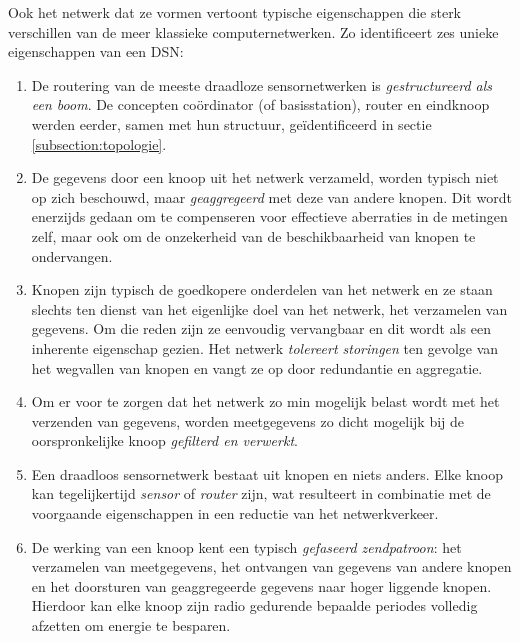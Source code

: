 Ook het netwerk dat ze vormen vertoont typische eigenschappen die sterk
verschillen van de meer klassieke computernetwerken. Zo identificeert
\citep{blilat2012wireless} zes unieke eigenschappen van een DSN:
\begin{enumerate}

\item{De routering van de meeste draadloze sensornetwerken is
\emph{gestructureerd als een boom}. De concepten co\"ordinator (of
basisstation), router en eindknoop werden eerder, samen met hun structuur,
ge\"identificeerd in sectie \ref{subsection:topologie}.}

\item{De gegevens door een knoop uit het netwerk verzameld, worden typisch niet
op zich beschouwd, maar \emph{geaggregeerd} met deze van andere knopen. Dit
wordt enerzijds gedaan om te compenseren voor effectieve aberraties in de
metingen zelf, maar ook om de onzekerheid van de beschikbaarheid van knopen te
ondervangen.}

\item{Knopen zijn typisch de goedkopere onderdelen van het netwerk en ze staan
slechts ten dienst van het eigenlijke doel van het netwerk, het verzamelen van
gegevens. Om die reden zijn ze eenvoudig vervangbaar en dit wordt als een
inherente eigenschap gezien. Het netwerk \emph{tolereert storingen} ten gevolge
van het wegvallen van knopen en vangt ze op door redundantie en aggregatie.}

\item{Om er voor te zorgen dat het netwerk zo min mogelijk belast wordt met het
verzenden van gegevens, worden meetgegevens zo dicht mogelijk bij de
oorspronkelijke knoop \emph{gefilterd en verwerkt}.}

\item{Een draadloos sensornetwerk bestaat uit knopen en niets anders. Elke
knoop kan tegelijkertijd \emph{sensor} of \emph{router} zijn, wat resulteert in
combinatie met de voorgaande eigenschappen in een reductie van het
netwerkverkeer.}

\item{De werking van een knoop kent een typisch \emph{gefaseerd zendpatroon}:
het verzamelen van meetgegevens, het ontvangen van gegevens van andere knopen
en het doorsturen van geaggregeerde gegevens naar hoger liggende knopen.
Hierdoor kan elke knoop zijn radio gedurende bepaalde periodes volledig
afzetten om energie te besparen.}

\end{enumerate}

